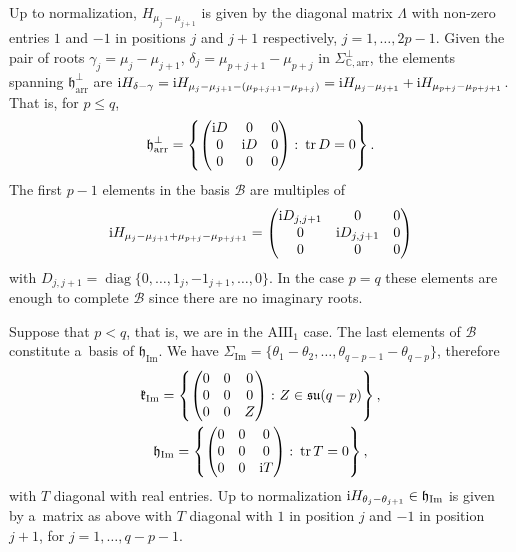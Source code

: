 \documentclass[10pt,a4paper]{amsart}
\numberwithin{equation}{section}
\newcommand{\func}[1]{\operatorname{#1}}
\begin{document}
Up to normalization, $H_{\mu _{j}-\mu _{j+1}}$ is given by the diagonal matrix $\Lambda $ with non-zero entries $1$ and $-1$ in positions $j$ and $j+1$ respectively, $j=1, \ldots,2p-1$. Given the pair of roots $%
\gamma_j=\mu_j-\mu_{j+1}$, $\delta_j=\mu_{p+j+1}-\mu_{p+j}$ in $\Sigma _{\mathbb{C},\mathrm{arr}}^\bot$, the elements spanning $\mathfrak{h }_{\mathrm{arr}}^\bot$ are ${\rm i}H_{\delta-\gamma}={\rm i} H_{\mu _{j}-\mu _{j+1}-(\mu_{p+j+1}-\mu _{p+j})}={\rm i}H_{\mu _{j}-\mu _{j+1}}+{\rm i}H_{\mu _{p+j}-\mu _{p+j+1}}$. That is, for $p\leq q$,
\begin{gather}
\mathfrak{h}_{\mathrm{arr}}^{\bot }=\left\{\left(
\begin{matrix}
{\rm i}D & 0 & 0 \\
0 & {\rm i}D & 0 \\
0 & 0 & 0
\end{matrix}
\right)\colon \operatorname{tr}D=0\right\}. \label{formatrizhortogonal}
\end{gather}
The first $p-1$ elements in the basis $\mathcal{B}$ are multiples
of
\begin{gather*}
{\rm i}H_{\mu _{j}-\mu _{j+1}+\mu _{p+j}-\mu _{p+j+1}}=\left(
\begin{matrix}
{\rm i}D_{j,j+1} & 0 & 0 \\
0 & {\rm i}D_{j,j+1} & 0 \\
0 & 0 & 0
\end{matrix}
\right)
\end{gather*}
with $D_{j,j+1}=\operatorname{diag}\{0,\ldots,1_{j},-1_{j+1},\ldots,0\}$. In the case $p=q$ these elements are enough to complete $\mathcal{B}$ since there are no imaginary roots.

Suppose that $p<q$, that is, we are in the $\mathrm{AIII}_{1}$ case. The last elements of $\mathcal{B}$ constitute a~basis of $\mathfrak{h }_{\mathrm{Im}}$. We have $\Sigma_{\func{Im}} =\{\theta_1-\theta_2,\ldots,\theta_{q-p-1}-\theta_{q-p}\}$, therefore
\begin{gather*}
\mathfrak{k}_{\func{Im}} = \left\{\left(
\begin{matrix}
0 & 0 & 0 \\
0 & 0 & 0 \\
0 & 0 & Z
\end{matrix}
\right)\colon Z\in \mathfrak{su}(q-p) \right\}, \\
\mathfrak{h}_{\func{Im}} = \left\{\left(
\begin{matrix}
0 & 0 & 0 \\
0 & 0 & 0 \\
0 & 0 & {\rm i}T
\end{matrix}
\right)\colon \operatorname{tr}T=0 \right\},
\end{gather*}
with $T$ diagonal with real entries. Up to normalization ${\rm i}H_{\theta_j-\theta_{j+1}}\in \mathfrak{h }_{\mathrm{Im}}$ is given by a~matrix as above with $T$ diagonal with $1$ in position $j$ and $-1$ in position $j+1$, for $j=1, \ldots,q-p-1$.
\end{document}
